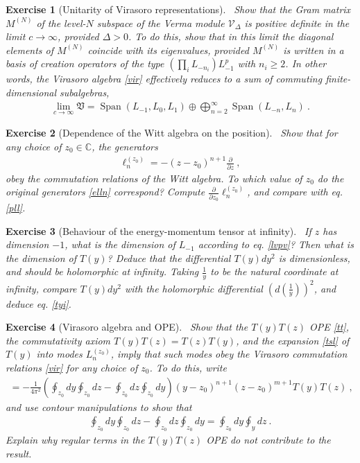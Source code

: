 \documentclass[12pt, a4paper, notitlepage, twoside]{report}
\numberwithin{equation}{section}
\theoremstyle{break}
\newtheorem{exo}{Exercise}[chapter]
\begin{document}
\begin{exo}[Unitarity of Virasoro representations]
~\label{exoun}
Show that the Gram matrix $M^{(N)}$ of the level-$N$ subspace of the Verma module $\mathcal{V}_\Delta$ is positive definite in the limit $c\to \infty$, provided  $\Delta >0$. 
To do this, show that in this limit the diagonal elements of $M^{(N)}$ coincide with its eigenvalues, provided $M^{(N)}$ is written in a basis of creation operators of the type $(\prod_i L_{-n_i}) L_{-1}^p$ with $n_i\geq 2$.
In other words, the Virasoro algebra \eqref{vir} effectively reduces to a sum of commuting finite-dimensional subalgebras, 
\begin{align}
 \underset{c\to \infty}{\lim} \mathfrak{V}  
=  \operatorname{Span}(L_{-1},L_0,L_1) \oplus \bigoplus_{n=2}^\infty \operatorname{Span} (L_{-n}, L_n)\ .
\end{align}
\end{exo}

\begin{exo}[Dependence of the Witt algebra on the position]
 ~\label{exowitt}
Show that for any choice of $z_0\in\mathbb{C}$, the generators 
\begin{align}
 \ell_n^{(z_0)} = -(z-z_0)^{n+1}{\frac{\partial}{\partial z}}\ ,
\end{align}
obey the commutation relations of the Witt algebra. To which value of $z_0$ do the original generators \eqref{elln} correspond?
Compute $\frac{\partial}{\partial z_0} \ell_n^{(z_0)}$, and compare with eq. \eqref{pll}.
\end{exo}

\begin{exo}[Behaviour of the energy-momentum tensor at infinity]
 ~\label{exoti}
 If $z$ has dimension $-1$, what is the dimension of $L_{-1}$ according to eq. \eqref{lvpv}? Then what is the dimension of $T(y)$? Deduce that the differential $T(y)dy^2$ is dimensionless, and should be holomorphic at infinity. Taking $\frac{1}{y}$ to be the natural coordinate at infinity, compare $T(y)dy^2$ with the holomorphic differential $\left(d(\frac{1}{y})\right)^2$, and deduce eq. \eqref{tyi}.
\end{exo}


\begin{exo}[Virasoro algebra and OPE] 
~\label{exott}
Show that the $T(y)T(z)$ OPE \eqref{tt}, the commutativity axiom $T(y)T(z) = T(z)T(y)$, and the expansion \eqref{tsl} of $T(y)$ into modes $L_n^{(z_0)}$, imply that such modes obey the Virasoro commutation relations \eqref{vir} for any choice of $z_0$.
To do this, write 
\begin{align}
 [L_n^{(z_0)},L_m^{(z_0)}] = -\frac{1}{4\pi^2} \left(\oint_{z_0} dy \oint_{z_0} dz - \oint_{z_0} dz \oint_{z_0} dy\right) (y-z_0)^{n+1}(z-z_0)^{m+1} T(y)T(z)\ ,
\end{align}
and use contour manipulations to show that 
\begin{align}
 \oint_{z_0} dy \oint_{z_0} dz - \oint_{z_0} dz \oint_{z_0} dy = \oint_{z_0} dy \oint_y dz\ .
\end{align}
Explain why regular terms in the $T(y)T(z)$ OPE do not contribute to the result.
\end{exo}
\end{document}
